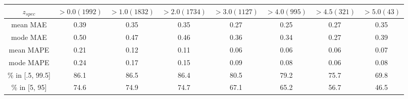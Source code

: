\begin{tabular*}{0.95\textwidth}{cccccccc} 
\hline\abovespace\belowspace 
$z_{spec}$ & $ > 0.0 (1992)$ & $ > 1.0 (1832)$ & $ > 2.0 (1734)$ & $ > 3.0 (1127)$ & $ > 4.0 (995)$ & $ > 4.5 (321)$ & $ > 5.0 (43)$\\ 
\hline 
\abovespace 
mean MAE & 0.39 & 0.35 & 0.35 & 0.27 & 0.25 & 0.27 & 0.35 \\ 
mode MAE & 0.50 & 0.47 & 0.46 & 0.36 & 0.34 & 0.27 & 0.39 \\ 
mean MAPE & 0.21 & 0.12 & 0.11 & 0.06 & 0.06 & 0.06 & 0.07 \\ 
mode MAPE & 0.24 & 0.17 & 0.15 & 0.09 & 0.08 & 0.06 & 0.08 \\ 
\hline 
\% in [.5, 99.5] & 86.1 & 86.5 & 86.4 & 80.5 & 79.2 & 75.7 & 69.8 \\ 
\% in [5, 95] & 74.6 & 74.9 & 74.7 & 67.1 & 65.2 & 56.7 & 46.5\\ 
 \hline\end{tabular*}